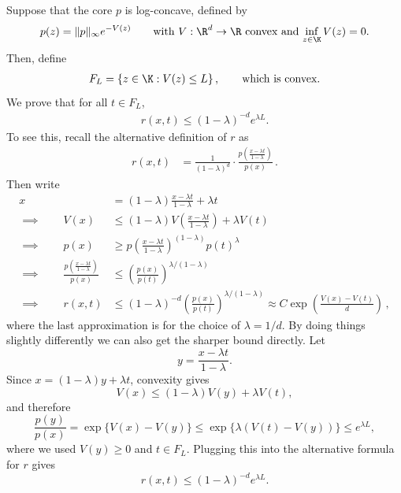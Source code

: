 Suppose that the core $p$ is log-concave, defined by
\begin{align}
    p(z) = \|p\|_\infty e^{-V(z)}\qquad \text{with $V:\R^d\to\R$ convex and $\inf_{z\in\K} V(z)=0$.}
\end{align}
Then, define
\begin{align}
    F_L = \left\{z \in \K: V(z) \le L\right\},
    \qquad
    \text{which is convex.}
\end{align}
We prove that for all $t \in F_L$,
\begin{align}
    r(x, t) \leq (1 - \lambda)^{-d} e^{\lambda L}.
\end{align}
To see this, recall the alternative definition of $r$ as
\begin{align}
    r(x, t) & = \frac{1}{(1-\lambda)^d} \cdot \frac{p\left(\frac{x-\lambda t}{1-\lambda}\right)}{p(x)}\,.
\end{align}
Then write
\begin{align}
    x    & = (1-\lambda) \frac{x - \lambda t}{1-\lambda} + \lambda t                       \\
    \implies\qquad
    V(x) & \leq (1-\lambda) V\left(\frac{x - \lambda t}{1-\lambda}\right) + \lambda V(t)   \\
    \implies\qquad
    p(x) & \geq p\left(\frac{x - \lambda t}{1-\lambda}\right)^{(1-\lambda)} p(t)^{\lambda} \\
    \implies\qquad
    \frac{p\left(\frac{x - \lambda t}{1-\lambda}\right)}{p(x)}
         & \leq  \left(\frac{p(x)}{p(t)}\right)^{\lambda/(1-\lambda)}
    \\
    \implies\qquad
    r(x, t)
         & \leq
    (1-\lambda)^{-d}
    \left(\frac{p(x)}{p(t)}\right)^{\lambda/(1-\lambda)}
    \approx
    C \exp\left( \frac{V(x) - V(t)}{d}\right)\,,
\end{align}
where the last approximation is for the choice of $\lambda = 1/d$.
By doing things slightly differently we can also get the sharper bound directly. Let
\[
    y=\frac{x-\lambda t}{1-\lambda}.
\]
Since \(x=(1-\lambda)y+\lambda t\), convexity gives
\[
    V(x)\le (1-\lambda)V(y)+\lambda V(t),
\]
and therefore
\[
    \frac{p(y)}{p(x)}
    =
    \exp\{V(x)-V(y)\}
    \le
    \exp\{\lambda(V(t)-V(y))\}
    \le e^{\lambda L},
\]
where we used \(V(y)\ge 0\) and \(t\in F_L\). Plugging this into the alternative formula for \(r\) gives
\[
    r(x,t)\le (1-\lambda)^{-d}e^{\lambda L}.
\]


